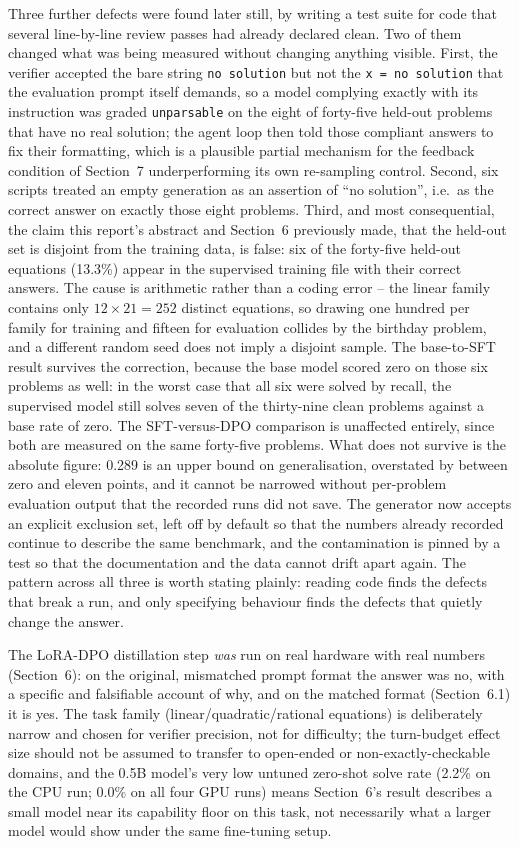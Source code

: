 \documentclass[11pt]{article}
\begin{document}
Three further defects were found later still, by writing a test suite for
code that several line-by-line review passes had already declared clean. Two
of them changed what was being measured without changing anything visible.
First, the verifier accepted the bare string \texttt{no solution} but not
the \texttt{x = no solution} that the evaluation prompt itself demands, so a
model complying exactly with its instruction was graded \texttt{unparsable}
on the eight of forty-five held-out problems that have no real solution; the
agent loop then told those compliant answers to fix their formatting, which
is a plausible partial mechanism for the feedback condition of Section~7
underperforming its own re-sampling control. Second, six scripts treated an
empty generation as an assertion of ``no solution'', i.e.\ as the correct
answer on exactly those eight problems. Third, and most consequential, the
claim this report's abstract and Section~6 previously made, that the held-out
set is disjoint from the training data, is false: six of the forty-five
held-out equations (13.3\%) appear in the supervised training file with
their correct answers. The cause is arithmetic rather than a coding error --
the linear family contains only $12 \times 21 = 252$ distinct equations, so
drawing one hundred per family for training and fifteen for evaluation
collides by the birthday problem, and a different random seed does not imply
a disjoint sample. The base-to-SFT result survives the correction, because
the base model scored zero on those six problems as well: in the worst case
that all six were solved by recall, the supervised model still solves seven
of the thirty-nine clean problems against a base rate of zero. The
SFT-versus-DPO comparison is unaffected entirely, since both are measured on
the same forty-five problems. What does not survive is the absolute figure:
0.289 is an upper bound on generalisation, overstated by between zero and
eleven points, and it cannot be narrowed without per-problem evaluation
output that the recorded runs did not save. The generator now accepts an
explicit exclusion set, left off by default so that the numbers already
recorded continue to describe the same benchmark, and the contamination is
pinned by a test so that the documentation and the data cannot drift apart
again. The pattern across all three is worth stating plainly: reading code
finds the defects that break a run, and only specifying behaviour finds the
defects that quietly change the answer.

The LoRA-DPO distillation step \emph{was} run on real
hardware with real numbers (Section~6): on the original, mismatched prompt
format the answer was no, with a specific and falsifiable account of why,
and on the matched format (Section~6.1) it is yes. The task family
(linear/quadratic/rational equations) is deliberately narrow and chosen
for verifier precision, not for difficulty; the turn-budget effect size
should not be assumed to transfer to open-ended or non-exactly-checkable
domains, and the 0.5B model's very low untuned zero-shot solve
rate (2.2\% on the CPU run; 0.0\% on all four GPU runs) means Section~6's result describes a small model near
its capability floor on this task, not necessarily what a larger model
would show under the same fine-tuning setup.
\end{document}
